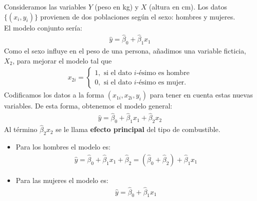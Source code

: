 \begin{ejemplo}
 Consideramos las variables $Y$ (peso en kg) y $X$ (altura en cm). Los datos $\{(x_i, y_i)\}$ provienen de dos poblaciones según el sexo: hombres y mujeres.
 \\
 \newline
 El modelo conjunto sería:
    \begin{align*}
        \widehat{y} = \widehat{\beta}_0 + \widehat{\beta}_1x_1
    \end{align*}
Como el sexo influye en el peso de una persona, añadimos una variable ficticia, $X_2$, para mejorar el modelo tal que
\begin{align*}
    x_{2i} =  \begin{cases}
            1, \text{ si el dato $i$-ésimo es hombre} \\
            0, \text{ si el dato $i$-ésimo es mujer}.
        \end{cases}
\end{align*}
Codificamos los datos a la forma $(x_{1i}, x_{2i}, y_i)$ para tener en cuenta estas nuevas variables.
De esta forma, obtenemos el modelo general:
    \begin{align*}
        \widehat{y} = \widehat{\beta}_0 + \widehat{\beta}_1x_1 + \widehat{\beta}_2x_2
    \end{align*}
Al término $\widehat{\beta}_2x_2$ se le llama \textbf{efecto principal} del tipo de combustible.
\begin{itemize}
    \item Para los hombres el modelo es:
              \begin{align*}
                  \widehat{y} = \widehat{\beta}_0 + \widehat{\beta}_1x_1 + \widehat{\beta}_2 = (\widehat{\beta}_0 + \widehat{\beta}_2) + \widehat{\beta}_1x_1
              \end{align*}
    \item Para las mujeres el modelo es:
              \begin{align*}
                  \widehat{y} = \widehat{\beta}_0 + \widehat{\beta}_1x_1
              \end{align*}
\end{itemize}


\end{ejemplo}
